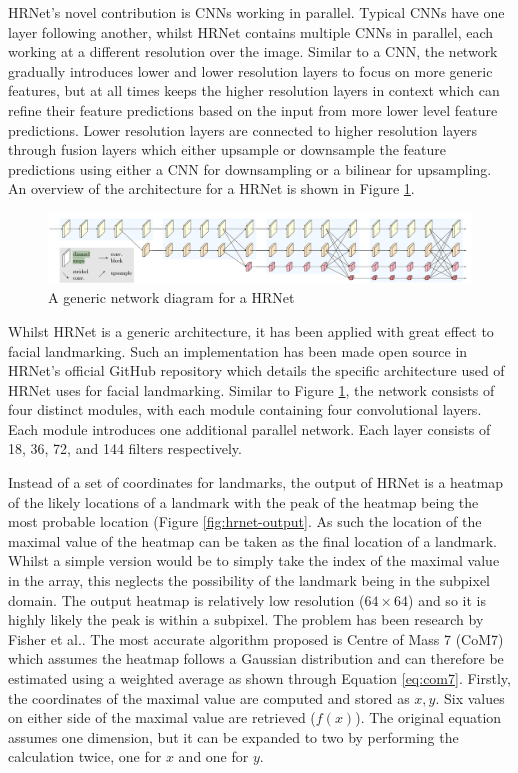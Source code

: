HRNet's novel contribution is CNNs working in parallel. Typical CNNs have one layer following another, whilst HRNet contains multiple CNNs in parallel, each working at a different resolution over the image. Similar to a CNN, the network gradually introduces lower and lower resolution layers to focus on more generic features, but at all times keeps the higher resolution layers in context which can refine their feature predictions based on the input from more lower level feature predictions. Lower resolution layers are connected to higher resolution layers through fusion layers which either upsample or downsample the feature predictions using either a CNN for downsampling or a bilinear for upsampling. An overview of the architecture for a HRNet is shown in Figure \ref{fig:hrnet-diagram}.

\begin{figure}[h]
    \centering
    \includegraphics[width=1\linewidth]{dissertation//figures/hrnet-network.png}
    \caption{A generic network diagram for a HRNet\cite{sun2019high}}
    \label{fig:hrnet-diagram}
\end{figure}

Whilst HRNet is a generic architecture, it has been applied with great effect to facial landmarking. Such an implementation has been made open source in HRNet's official GitHub repository\cite{zhao2019facial} which details the specific architecture used of HRNet uses for facial landmarking. Similar to Figure \ref{fig:hrnet-diagram}, the network consists of four distinct modules, with each module containing four convolutional layers. Each module introduces one additional parallel network. Each layer consists of 18, 36, 72, and 144 filters respectively.

Instead of a set of coordinates for landmarks, the output of HRNet is a heatmap of the likely locations of a landmark with the peak of the heatmap being the most probable location (Figure \ref{fig:hrnet-output}. As such the location of the maximal value of the heatmap can be taken as the final location of a landmark. Whilst a simple version would be to simply take the index of the maximal value in the array, this neglects the possibility of the landmark being in the subpixel domain. The output heatmap is relatively low resolution ($64\times64$) and so it is highly likely the peak is within a subpixel. The problem has been research by Fisher et al.\cite{fisher1996comparison}. The most accurate algorithm proposed is Centre of Mass 7 (CoM7) which assumes the heatmap follows a Gaussian distribution and can therefore be estimated using a weighted average as shown through Equation \ref{eq:com7}. Firstly, the coordinates of the maximal value are computed and stored as $x,y$. Six values on either side of the maximal value are retrieved ($f(x)$). The original equation assumes one dimension, but it can be expanded to two by performing the calculation twice, one for $x$ and one for $y$.

